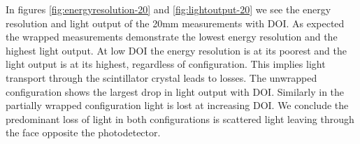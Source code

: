 In figures \ref{fig:energyresolution-20} and \ref{fig:lightoutput-20} we see the energy resolution and light output of the 20mm measurements with DOI. As expected the wrapped measurements demonstrate the lowest energy resolution and the highest light output.  At low DOI the energy resolution is at its poorest and the light output is at its highest, regardless of configuration. This implies light transport through the scintillator crystal leads to losses. The unwrapped configuration shows the largest drop in light output with DOI. Similarly in the partially wrapped configuration light is lost at increasing DOI. We conclude the predominant loss of light in both configurations is scattered light leaving through the face opposite the photodetector.